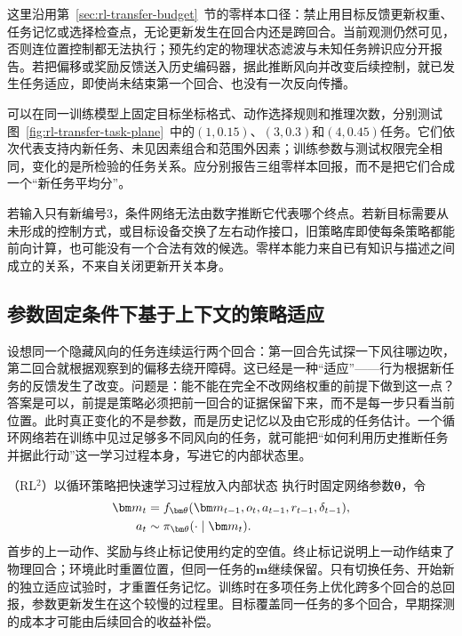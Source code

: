这里沿用第~\ref{sec:rl-transfer-budget}~节的零样本口径：禁止用目标反馈更新权重、任务记忆或选择检查点，无论更新发生在回合内还是跨回合。当前观测仍然可见，否则连位置控制都无法执行；预先约定的物理状态滤波与未知任务辨识应分开报告。若把偏移或奖励反馈送入历史编码器，据此推断风向并改变后续控制，就已发生任务适应，即使尚未结束第一个回合、也没有一次反向传播。

可以在同一训练模型上固定目标坐标格式、动作选择规则和推理次数，分别测试图~\ref{fig:rl-transfer-task-plane}~中的$(1,0.15)$、$(3,0.3)$和$(4,0.45)$任务。它们依次代表支持内新任务、未见因素组合和范围外因素；训练参数与测试权限完全相同，变化的是所检验的任务关系。应分别报告三组零样本回报，而不是把它们合成一个“新任务平均分”。

若输入只有新编号3，条件网络无法由数字推断它代表哪个终点。若新目标需要从未形成的控制方式，或目标设备交换了左右动作接口，旧策略库即使每条策略都能前向计算，也可能没有一个合法有效的候选。零样本能力来自已有知识与描述之间成立的关系，不来自关闭更新开关本身。

\subsection{参数固定条件下基于上下文的策略适应}
\label{sec:rl-transfer-context-adaptation}

设想同一个隐藏风向的任务连续运行两个回合：第一回合先试探一下风往哪边吹，第二回合就根据观察到的偏移去绕开障碍。这已经是一种“适应”——行为根据新任务的反馈发生了改变。问题是：能不能在完全不改网络权重的前提下做到这一点？答案是可以，前提是策略必须把前一回合的证据保留下来，而不是每一步只看当前位置。此时真正变化的不是参数，而是历史记忆以及由它形成的任务估计。一个循环网络若在训练中见过足够多不同风向的任务，就可能把“如何利用历史推断任务并据此行动”这一学习过程本身，写进它的内部状态里。

（RL$^2$）以循环策略把快速学习过程放入内部状态
执行时固定网络参数$\bm\theta$，令
\begin{align}
 \bm m_t
 &=f_{\bm\theta}(\bm m_{t-1},o_t,a_{t-1},r_{t-1},\delta_{t-1}),\notag\\
 a_t&\sim\pi_{\bm\theta}(\cdot\mid\bm m_t).
 \label{eq:rl-transfer-rl2}
\end{align}
首步的上一动作、奖励与终止标记使用约定的空值。终止标记说明上一动作结束了物理回合；环境此时重置位置，但同一任务的$\bm m$继续保留。只有切换任务、开始新的独立适应试验时，才重置任务记忆。训练时在多项任务上优化跨多个回合的总回报，参数更新发生在这个较慢的过程里。目标覆盖同一任务的多个回合，早期探测的成本才可能由后续回合的收益补偿。

